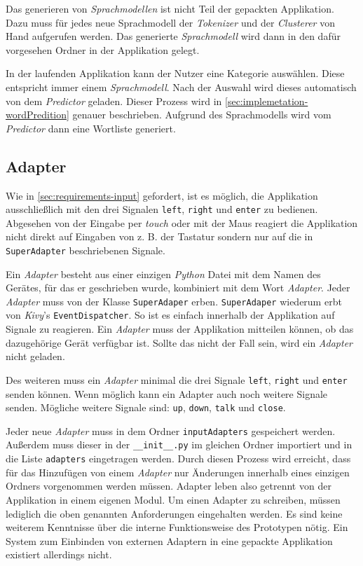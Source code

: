 		Das generieren von \emph{Sprachmodellen} ist nicht Teil der gepackten Applikation. Dazu muss für jedes neue Sprachmodell der \emph{Tokenizer} und der \emph{Clusterer} von Hand aufgerufen werden. Das generierte \emph{Sprachmodell} wird dann in den dafür vorgesehen Ordner in der Applikation gelegt.

		In der laufenden Applikation kann der Nutzer eine Kategorie auswählen. Diese entspricht immer einem \emph{Sprachmodell}. Nach der Auswahl wird dieses automatisch von dem \emph{Predictor} geladen. Dieser Prozess wird in \autoref{sec:implemetation-wordPredition} genauer beschrieben. Aufgrund des Sprachmodells wird vom \emph{Predictor} dann eine Wortliste generiert.
       
    \subsection{Adapter}
    	Wie in \autoref{sec:requirements-input} gefordert, ist es möglich, die Applikation ausschließlich mit den drei Signalen \texttt{left}, \texttt{right} und \texttt{enter} zu bedienen. Abgesehen von der Eingabe per \emph{touch} oder mit der Maus reagiert die Applikation nicht direkt auf Eingaben von z. B. der Tastatur sondern nur auf die in \texttt{SuperAdapter} beschriebenen Signale.  
    
    	Ein \emph{Adapter} besteht aus einer einzigen \emph{Python} Datei mit dem Namen des Gerätes, für das er geschrieben wurde, kombiniert mit dem Wort \emph{Adapter}. Jeder \emph{Adapter} muss von der Klasse \texttt{SuperAdaper} erben. \texttt{SuperAdaper} wiederum erbt von \emph{Kivy}'s \texttt{EventDispatcher}.
So ist es einfach innerhalb der Applikation auf Signale zu reagieren. Ein \emph{Adapter} muss der Applikation mitteilen können, ob das dazugehörige Gerät verfügbar ist. Sollte das nicht der Fall sein, wird ein \emph{Adapter} nicht geladen.

		Des weiteren muss ein \emph{Adapter} minimal die drei Signale \texttt{left}, \texttt{right} und \texttt{enter} senden können. Wenn möglich kann ein Adapter auch noch weitere Signale senden. Mögliche weitere Signale sind: \texttt{up}, \texttt{down}, \texttt{talk} und \texttt{close}.
        
        Jeder neue \emph{Adapter} muss in dem Ordner \texttt{inputAdapters} gespeichert werden. Außerdem muss dieser in der \texttt{\_\_init\_\_.py} im gleichen Ordner importiert und in die Liste \texttt{adapters} eingetragen werden. Durch diesen Prozess wird erreicht, dass für das Hinzufügen von einem \emph{Adapter} nur Änderungen innerhalb eines einzigen Ordners vorgenommen werden müssen. Adapter leben also getrennt von der Applikation in einem eigenen Modul. Um einen Adapter zu schreiben, müssen lediglich die oben genannten Anforderungen eingehalten werden. Es sind keine weiterem Kenntnisse über die interne Funktionsweise des Prototypen nötig. Ein System zum Einbinden von externen Adaptern in eine gepackte Applikation existiert allerdings nicht.
	
    \newpage